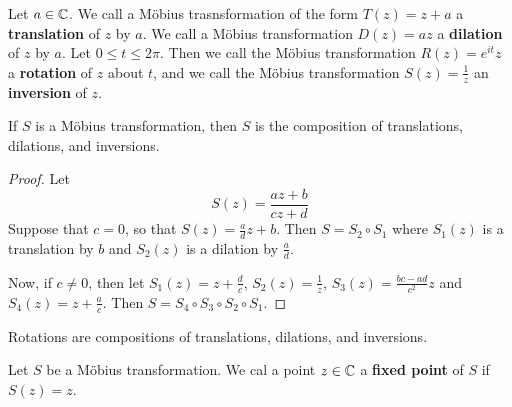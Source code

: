 \begin{definition}
    Let $a \in \mathbb{C}$. We call a M\"obius trasnsformation of the form $T(z)=z+a$ a
    \textbf{translation} of $z$ by  $a$. We call a M\"obius transformation
    $D(z)=az$ a \textbf{dilation} of $z$ by  $a$.  Let $0 \leq t \leq 2\pi$.
    Then we call the M\"obius transformation  $R(z)=e^{it}z$ a \textbf{rotation}
    of $z$ about  $t$, and we call the M\"obius transformation
    $S(z)=\frac{1}{z}$ an \textbf{inversion} of $z$.
\end{definition}

\begin{lemma}\label{3.3.2}
    If $S$ is a M\"obius transformation, then  $S$ is the composition of
    translations, dilations, and inversions.
\end{lemma}
\begin{proof}
    Let
    \begin{equation*}
        S(z)=\frac{az+b}{cz+d}
    \end{equation*}
    Suppose that $c=0$, so that  $S(z)=\frac{a}{d}z+b$. Then $S=S_2 \circ S_1$
    where $S_1(z)$ is a translation by $b$ and $S_2(z)$ is a dilation by
    $\frac{a}{d}$.

    Now, if $c \neq 0$, then let  $S_1(z)=z+\frac{d}{c}$,
    $S_2(z)=\frac{1}{z}$, $S_3(z)=\frac{bc-ad}{c^2}z$ and
    $S_4(z)=z+\frac{a}{c}$. Then $S=S_4 \circ S_3 \circ S_2 \circ S_1$.
\end{proof}
\begin{corollary}
    Rotations are compositions of translations, dilations, and inversions.
\end{corollary}

\begin{definition}
    Let $S$ be a M\"obius transformation. We cal a point $z \in \mathbb{C}$ a
    \textbf{fixed point} of $S$ if  $S(z)=z$.
\end{definition}
